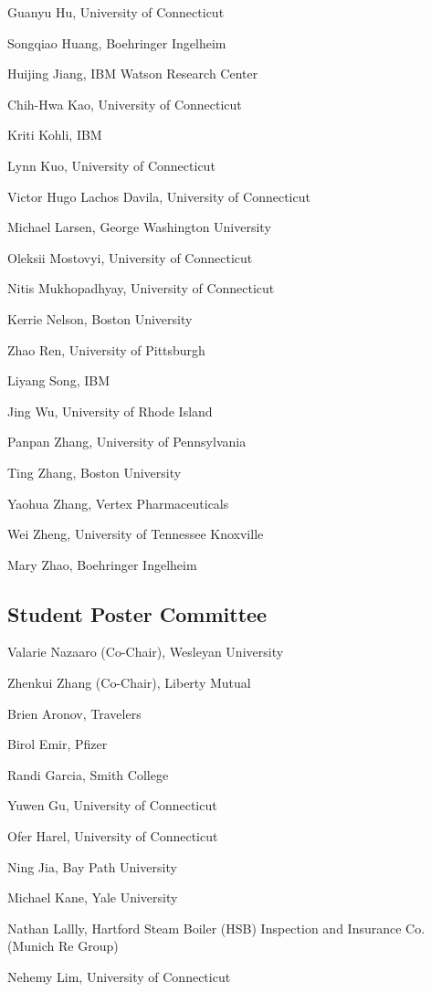 \documentclass[10pt]{article}
\begin{document}
{Guanyu Hu, University of Connecticut

Songqiao Huang, Boehringer Ingelheim

Huijing Jiang, IBM Watson Research Center

Chih-Hwa Kao, University of Connecticut

Kriti Kohli, IBM

Lynn Kuo, University of Connecticut

Victor Hugo Lachos Davila, University of Connecticut

Michael Larsen, George Washington University

Oleksii Mostovyi, University of Connecticut

Nitis Mukhopadhyay, University of Connecticut

Kerrie Nelson, Boston University

Zhao Ren, University of Pittsburgh

Liyang Song, IBM

Jing Wu, University of Rhode Island

Panpan Zhang, University of Pennsylvania

Ting Zhang, Boston University

Yaohua Zhang, Vertex Pharmaceuticals

Wei Zheng, University of Tennessee Knoxville

Mary Zhao, Boehringer Ingelheim

\subsection*{Student Poster Committee}

Valarie Nazaaro (Co-Chair), Wesleyan University

Zhenkui Zhang (Co-Chair), Liberty Mutual

\bigskip

Brien Aronov, Travelers

Birol Emir, Pfizer

Randi Garcia, Smith College

Yuwen Gu, University of Connecticut

Ofer Harel, University of Connecticut

Ning Jia, Bay Path University

Michael Kane, Yale University

Nathan Lallly, Hartford Steam Boiler (HSB) Inspection and Insurance
Co. (Munich Re Group)

Nehemy Lim, University of Connecticut

}
\end{document}
